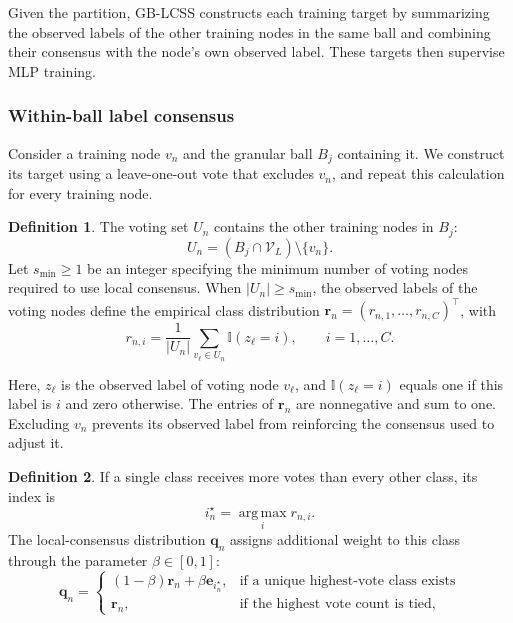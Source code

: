 \documentclass[10pt,letterpaper,nopreprintline]{elsarticle}
\theoremstyle{definition}
\newtheorem{definition}{Definition}
\theoremstyle{plain}
\begin{document}
Given the partition, GB-LCSS constructs each training target by summarizing the observed labels of the other training nodes in the same ball and combining their consensus with the node's own observed label. These targets then supervise MLP training.

\subsubsection{Within-ball label consensus}\label{sec:3.3.1}

Consider a training node \(v_n\) and the granular ball \(B_j\) containing it. We construct its target using a leave-one-out vote that excludes \(v_n\), and repeat this calculation for every training node.

\begin{definition}
The voting set \(U_n\) contains the other training nodes in \(B_j\):
\begin{equation}\label{eq:7}
U_n=(B_j\cap\mathcal V_L)\setminus\{v_n\}.
\end{equation}
Let \(s_{\min}\geq1\) be an integer specifying the minimum number of voting nodes required to use local consensus. When \(|U_n|\geq s_{\min}\), the observed labels of the voting nodes define the empirical class distribution \(\mathbf r_n=(r_{n,1},\ldots,r_{n,C})^\top\), with
\begin{equation}\label{eq:8}
r_{n,i}=\frac{1}{|U_n|}\sum_{v_\ell\in U_n}\mathbb I(z_\ell=i),
\qquad i=1,\ldots,C.
\end{equation}
\end{definition}

Here, \(z_\ell\) is the observed label of voting node \(v_\ell\), and \(\mathbb I(z_\ell=i)\) equals one if this label is \(i\) and zero otherwise. The entries of \(\mathbf r_n\) are nonnegative and sum to one. Excluding \(v_n\) prevents its observed label from reinforcing the consensus used to adjust it.

\Needspace{64pt}
\begin{definition}
If a single class receives more votes than every other class, its index is
\begin{equation}\label{eq:9}
i_n^\star=\operatorname*{arg\,max}_i r_{n,i}.
\end{equation}
The local-consensus distribution \(\mathbf q_n\) assigns additional weight to this class through the parameter \(\beta\in[0,1]\):
\begin{equation}\label{eq:10}
\mathbf q_n=
\begin{cases}
(1-\beta)\mathbf r_n+\beta\mathbf e_{i_n^\star},&\text{if a unique highest-vote class exists}\\
\mathbf r_n,&\text{if the highest vote count is tied},
\end{cases}
\end{equation}
\end{definition}
\end{document}

